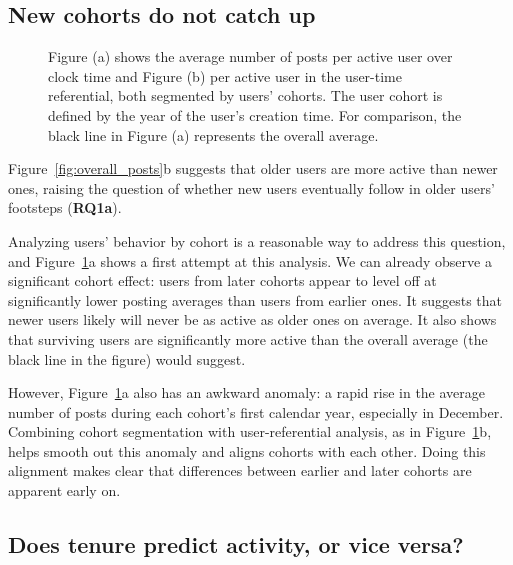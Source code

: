 \documentclass[10pt, oneside, onecolumn]{article}
\begin{document}
\subsection{New cohorts do not catch up}

\begin{figure}[!tb]
\centering
{}
\caption{Figure (a) shows the average number of posts per active user over clock time and Figure (b) per active user in the user-time referential, both segmented by users' cohorts. The user cohort is defined by the year of the user's creation time.  For comparison, the black line in Figure (a) represents the overall average.}
\label{fig:avr_posts_per_user_over_time_cohorts}
\end{figure}

Figure~\ref{fig:overall_posts}b suggests that older users are more active than newer ones, raising the question of whether new users
eventually follow in older users' footsteps (\textbf{RQ1a}).  

Analyzing users' behavior by cohort is a reasonable way to address this question, and Figure~\ref{fig:avr_posts_per_user_over_time_cohorts}a shows a first attempt at this analysis.  We can already observe a significant cohort effect: users from later cohorts appear to level off at significantly lower posting averages than users from earlier ones.  It suggests that newer users likely will never be as active as older ones on average.  It also shows that surviving users are significantly more active than the overall average (the black line in the figure) would suggest.

However, Figure~\ref{fig:avr_posts_per_user_over_time_cohorts}a also has an awkward anomaly: a rapid rise in the average number of posts during each cohort's first calendar year, especially in December. Combining cohort segmentation with user-referential analysis, as in Figure~\ref{fig:avr_posts_per_user_over_time_cohorts}b, helps smooth out this anomaly and aligns cohorts with each other.  Doing this alignment makes clear that differences between earlier and later cohorts are apparent early on.

\subsection{Does tenure predict activity, or vice versa?}
\end{document}
